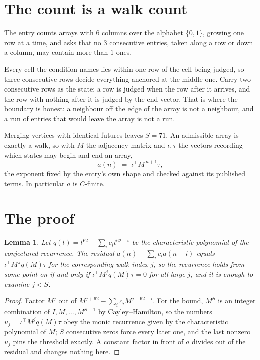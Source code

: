 \documentclass[11pt,a4paper]{article}
\theoremstyle{plain}
\newtheorem{lemma}[theorem]{Lemma}
\theoremstyle{definition}
\begin{document}
\section{The count is a walk count}

The entry counts arrays with $6$ columns over the alphabet $\{0,1\}$, growing one row at a time, and asks that no $3$ consecutive entries, taken along a row or down a column, may contain more than $1$ ones.

Every cell the condition names lies within one row of the cell being judged, so three consecutive rows decide everything anchored at the middle one. Carry two consecutive rows as the state; a row is judged when the row after it arrives, and the row with nothing after it is judged by the end vector. That is where the boundary is honest: a neighbour off the edge of the array is not a neighbour, and a run of entries that would leave the array is not a run.

Merging vertices with identical futures leaves $S=71$. An admissible array is exactly a walk, so with $M$ the adjacency matrix and $\iota,\tau$ the vectors recording which states may begin and end an array,
\[
a(n)\;=\;\iota^{\!\top}M^{\,n+1}\tau ,
\]
the exponent fixed by the entry's own shape and checked against its published terms. In
particular $a$ is $C$-finite.

\section{The proof}

\begin{lemma}\label{lem:crit}
Let $q(t)=t^{62}-\sum_i c_it^{62-i}$ be the characteristic polynomial of the
conjectured recurrence. The residual $a(n)-\sum_ic_ia(n-i)$ equals
$\iota^{\!\top}M^{\,j}q(M)\tau$ for the corresponding walk index $j$, so the recurrence
holds from some point on if and only if $\iota^{\!\top}M^{j}q(M)\tau=0$ for all large $j$,
and it is enough to examine $j<S$.
\end{lemma}

\begin{proof}
Factor $M^{j}$ out of $M^{j+62}-\sum_ic_iM^{j+62-i}$. For the bound, $M^{S}$
is an integer combination of $I,M,\dots,M^{S-1}$ by Cayley--Hamilton, so the numbers
$u_j=\iota^{\!\top}M^{j}q(M)\tau$ obey the monic recurrence given by the characteristic
polynomial of $M$; $S$ consecutive zeros force every later one, and the last nonzero $u_j$
pins the threshold exactly. A constant factor in front of $a$ divides out of the residual and
changes nothing here.
\end{proof}
\end{document}
